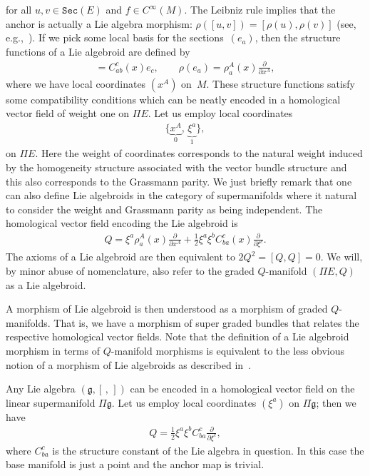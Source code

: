 \documentclass[pdftex]{sigma}
\def\Sec{\mathtt{Sec}}
\numberwithin{equation}{section}
\begin{document}
\noindent for all $u,v \in \Sec(E)$ and $f \in C^{\infty}(M)$. The Leibniz rule implies that the anchor is actually a Lie algebra morphism: $\rho\left([u,v]\right) = [\rho(u), \rho(v)]$ (see, e.g.,~\cite{Grabowski:2003}). If we pick some local basis for the sections~$(e_{a})$, then the structure functions of a Lie algebroid are def\/ined by
\begin{gather*}
[e_{a} , e_{b}]  =  C_{ab}^{c}(x)e_{c}, \qquad
\nonumber \rho(e_{a})  =  \rho_{a}^{A}(x)\frac{\partial}{\partial x^{A}},
\end{gather*}
 where we have local coordinates $(x^{A})$ on~$M$. These structure functions satisfy some compatibility conditions which can be neatly encoded in a homological vector f\/ield of weight one on $\Pi E$. Let us employ local coordinates
\begin{gather*}
\big\{\underbrace{x^{A}}_{0}, \, \underbrace{\xi^{a}}_{1}\big\},
\end{gather*}
on $\Pi E$. Here the weight of coordinates corresponds to the natural weight induced by the homogeneity structure associated with the vector bundle structure \cite{Grabowski:2006} and this also corresponds to the Grassmann parity. We just brief\/ly remark that one can also def\/ine Lie algebroids in the category of supermanifolds where it natural to consider the weight and Grassmann parity as being independent. The homological vector f\/ield encoding the Lie algebroid is
\begin{gather*}
Q = \xi^{a}\rho_{a}^{A}(x) \frac{\partial}{\partial x^{A}} + \frac{1}{2}\xi^{a}\xi^{b}C_{ba}^{c}(x)\frac{\partial}{\partial \xi^{c}}.
\end{gather*}
The axioms of a Lie algebroid are then equivalent to $2Q^{2} = [Q,Q]=0$. We will, by minor abuse of nomenclature, also refer to the graded $Q$-manifold $(\Pi E, Q)$ as a  Lie algebroid.


A morphism of Lie algebroid is then understood as a morphism of graded $Q$-manifolds. That is, we have a morphism of super graded bundles that relates the respective homological vector f\/ields. Note that the def\/inition of a Lie algebroid morphism in terms of $Q$-manifold morphisms  is  equivalent to the less obvious notion of a morphism of Lie algebroids as described in~\cite{Mackenzie2005}.



\begin{Example}
Any Lie algebra $(\mathfrak{g}, [\,,\,])$ can be encoded in a homological vector f\/ield on the linear supermanifold $\Pi \mathfrak{g}$. Let us employ local coordinates $(\xi^{a})$ on $\Pi \mathfrak{g}$; then we have
\begin{gather*}
Q = \frac{1}{2}\xi^{a}\xi^{b}C_{ba}^{c} \frac{\partial}{\partial \xi^{c}},
\end{gather*}
\noindent where $C_{ba}^{c}$ is the structure constant of the Lie algebra in question.
In this case the base manifold is just a point and the anchor map is trivial.
\end{Example}
\end{document}
